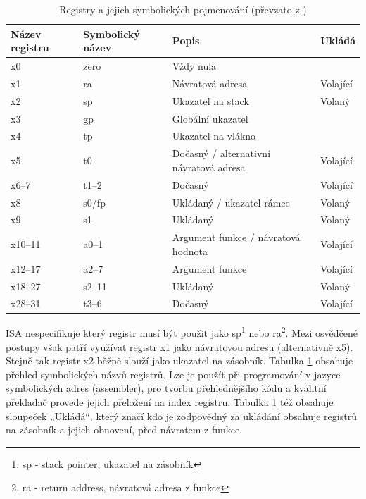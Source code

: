 \documentclass[FM,BP]{tulthesis}
\begin{document}
\begin{table}[h]
    \caption{Registry a jejich symbolických pojmenování (převzato z \cite{RISC-V_calling})}
    \label{table:registers}
    \begin{center}
        \begin{tabular}{|l|l|p{}|l|}
        \hline
        \textbf{Název registru} & \textbf{Symbolický název} & \textbf{Popis} & \textbf{Ukládá} \\
        \hline
        x0 & zero & Vždy nula & \\
        \hline
        x1 & ra & Návratová adresa & Volající \\
        \hline
        x2 & sp & Ukazatel na stack\index{stack} & Volaný \\
        \hline
        x3 & gp & Globální ukazatel &\\
        \hline
        x4 & tp & Ukazatel na vlákno &\\
        \hline
        x5 & t0 & Dočasný / alternativní návratová adresa & Volající \\
        \hline
        x6–7 & t1–2 & Dočasný & Volající \\
        \hline
        x8 & s0/fp & Ukládaný / ukazatel rámce & Volaný \\
        \hline
        x9 & s1 & Ukládaný & Volaný \\
        \hline
        x10–11 & a0–1 & Argument funkce / návratová hodnota & Volající \\
        \hline
        x12–17 & a2–7 & Argument funkce & Volající \\
        \hline
        x18–27 & s2–11 & Ukládaný & Volaný \\
        \hline
        x28–31 & t3–6 & Dočasný & Volající \\
        \hline
        \end{tabular}
    \end{center}
\end{table}

ISA nespecifikuje který registr musí být použit jako sp\footnote{sp - stack pointer, ukazatel na zásobník} nebo ra\footnote{ra - return address, návratová adresa z funkce}. Mezi osvědčené postupy však patří využívat registr x1 jako návratovou adresu (alternativně x5). Stejně tak registr x2 běžně slouží jako ukazatel na zásobník. Tabulka \ref{table:registers} obsahuje přehled symbolických názvů registrů. Lze je použít při programování v jazyce symbolických adres (assembler), pro tvorbu přehlednějšího kódu a kvalitní překladač provede jejich přeložení na index registru. Tabulka \ref{table:registers} též obsahuje sloupeček „Ukládá“, který značí kdo je zodpovědný za ukládání obsahuje registrů na zásobník a jejich obnovení, před návratem z funkce. 
\end{document}
